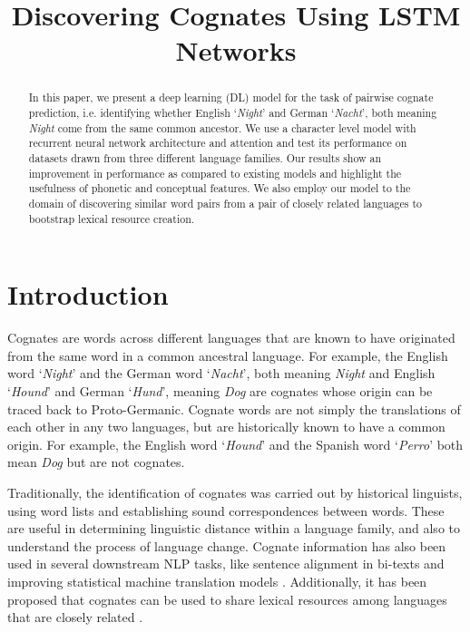 \documentclass[11pt,letterpaper]{article}
\title{Discovering Cognates Using LSTM Networks}
\date{}
\begin{document}
\maketitle

\begin{abstract}
In this paper, we present a deep learning (DL) model for the task of pairwise cognate prediction, i.e. identifying whether English `\textit{Night}' and German `\textit{Nacht}', both meaning \textit{Night} come from the same common ancestor. We use a character level model with recurrent neural network architecture and attention and test its performance on datasets drawn from three different language families. Our results show an improvement in performance as compared to existing models and highlight the usefulness of phonetic and conceptual features. We also employ our model to the domain of discovering similar word pairs from a pair of closely related languages to bootstrap lexical resource creation.
\end{abstract}

\section{Introduction}
Cognates are words across different languages that are known to have originated from the same word in a common ancestral language. For example, the English word  `\textit{Night}' and the German word `\textit{Nacht}', both meaning \textit{Night} and English `\textit{Hound}' and German `\textit{Hund}', meaning \textit{Dog} are cognates whose origin can be traced back to Proto-Germanic. Cognate words are not simply the translations of each other in any two languages, but are historically known to have a common origin. For example, the English word `\textit{Hound}' and the Spanish word `\textit{Perro}' both mean \textit{Dog} but are not cognates.

Traditionally, the identification of cognates was carried out by historical linguists, using word lists and establishing sound correspondences between words. These are useful in determining linguistic distance within a language family, and also to understand the process of language change. Cognate information has also been used in several downstream NLP tasks, like sentence alignment in bi-texts \cite{simard1993using} and improving statistical machine translation models \cite{kondrak2003cognates}. Additionally, it has been proposed that cognates can be used to share lexical resources among languages that are closely related \cite{Singh:07b}.
\end{document}

